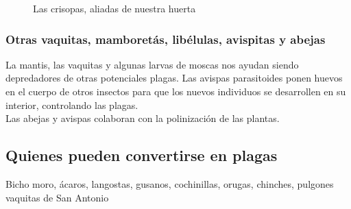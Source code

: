 \documentclass[../main.tex]{subfiles}
\begin{document}
\begin{figure}[H]
    \centering
    \caption*{\color{CompostGreen!50!black}Las crisopas, aliadas de nuestra huerta}
    \label{insectos2}
\end{figure}

\subsubsection{Otras vaquitas, mamboretás, libélulas, avispitas y abejas}

\begin{figure}[H]
    \centering
    \label{insectos3}
\end{figure}

La mantis, las vaquitas y algunas larvas de moscas nos ayudan siendo depredadores de otras potenciales plagas. Las avispas parasitoides ponen huevos en el cuerpo de otros insectos para que los nuevos individuos se desarrollen en su interior, controlando las plagas. \\

Las abejas y avispas colaboran con la polinización de las plantas.\\

\subsection{Quienes pueden convertirse en plagas}

Bicho moro, ácaros, langostas, gusanos, cochinillas, orugas, chinches, pulgones vaquitas de San Antonio
\end{document}
